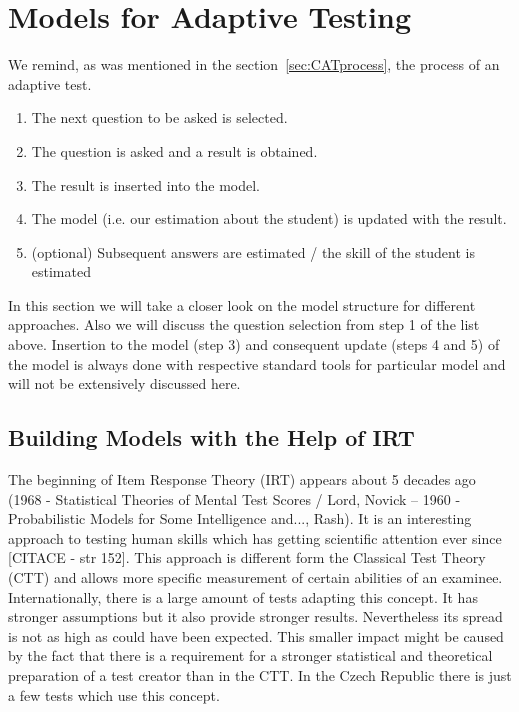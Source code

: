 \chapter{Models for Adaptive Testing}


We remind, as was mentioned in the section~\ref{sec:CATprocess}, the process of an adaptive test.
\begin{enumerate}
	\item The next question to be asked is selected.
	\item The question is asked and a result is obtained.
	\item The result is inserted into the model.
	\item The model (i.e. our estimation about the student) is updated with the result.
	\item (optional) Subsequent answers are estimated / the skill of the student is estimated
\end{enumerate}
In this section we will take a closer look on the model structure for different approaches. Also we will discuss the question selection from step 1 of the list above. Insertion to the model (step 3) and consequent update (steps 4 and 5) of the model is always done with respective standard tools for particular model and will not be extensively discussed here.

\section{Building Models with the Help of IRT}
\label{sec_IRT}
The beginning of Item Response Theory (IRT) appears about 5 decades ago (1968 - Statistical Theories of Mental Test Scores / Lord, Novick -- 1960 - Probabilistic Models for Some Intelligence and..., Rash). It is an interesting approach to testing human skills which has getting scientific attention ever since [CITACE - str 152]. This approach is different form the Classical Test Theory (CTT) and allows more specific measurement of certain abilities of an examinee. Internationally, there is a large amount of tests adapting this concept. It has stronger assumptions but it also provide stronger results. Nevertheless its spread is not as high as could have been expected. This smaller impact might be caused by the fact that there is a requirement for a stronger statistical and theoretical preparation of a test creator than in the CTT. In the Czech Republic there is just a few tests which use this concept. 

